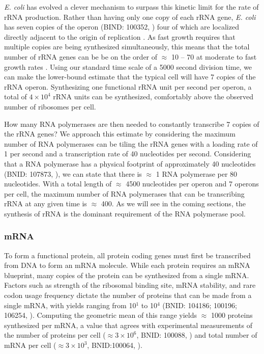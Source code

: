 \textit{E. coli} has evolved a clever mechanism to surpass this kinetic limit
for the rate of rRNA production. Rather than having only one copy of each
rRNA gene, \textit{E. coli} has seven copies of the operon (BIND: 100352,
\cite{milo2010}) four of which are localized directly adjacent to the origin of replication
\citep{birnbaum1971}. As fast growth requires that multiple copies are being
synthesized simultaneously, this means that the total number of rRNA genes
can be be on the order of $\approx$ 10 -- 70 at moderate to fast growth rates
\citep{stevenson2004}. Using our standard time scale of a 5000 second
division time, we can make the lower-bound estimate that the typical cell
will have 7 copies of the rRNA operon. Synthesizing one functional rRNA unit
per second per operon, a total of $4 \times 10^4$ rRNA units can be
synthesized, comfortably above the observed number of ribosomes per cell.

How many RNA polymerases are then needed to constantly transcribe 7 copies of
the rRNA genes? We approach this estimate by considering the maximum number
of RNA polymerases can be tiling the rRNA genes with a loading rate of 1 per
second and a transcription rate of 40 nucleotides per second. Considering
that a RNA polymerase has a physical footprint of approximately 40
nucleotides (BNID: 107873, \cite{milo2010}), we can state that there is
$\approx$ 1 RNA polymerase per 80 nucleotides. With a total length of
$\approx$ 4500 nucleotides per operon and 7 operons per cell, the maximum
number of RNA polymerases that can be transcribing rRNA at any given time is
$\approx$ 400. As we will see in the coming sections, the
synthesis of rRNA is the dominant requirement of the RNA polymerase pool.

\subsubsection{mRNA}
To form a functional protein, all protein coding genes must first be
transcribed from DNA to form an mRNA molecule. While each protein requires an
mRNA blueprint, many copies of the protein can be synthesized from a single
mRNA. Factors such as strength of the ribosomal binding site, mRNA stability,
and rare codon usage frequency dictate the number of proteins that can be
made from a single mRNA, with yields ranging from 10$^1$ to 10$^4$ (BNID: 104186; 100196;
106254, \cite{milo2010}). Computing the geometric mean of this range yields
$\approx$ 1000 proteins synthesized per mRNA, a value that agrees with
experimental measurements of the number of proteins per cell ($\approx 3
\times 10^6$, BNID: 100088, \cite{milo2010}) and total number of mRNA per
cell ($\approx 3 \times 10^3$, BNID:100064, \cite{milo2010}).  

